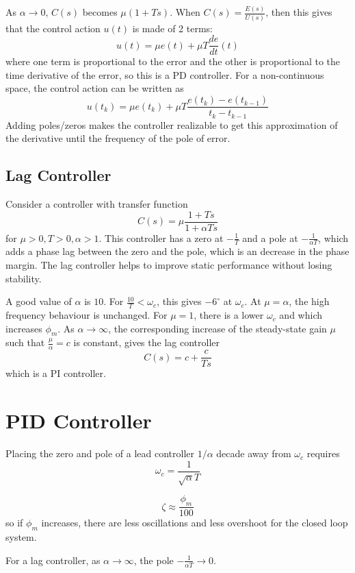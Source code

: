 \documentclass[11pt]{article}
\begin{document}
As \(\alpha \to 0\), \(C(s)\) becomes \(\mu(1 + Ts)\).
When \(C(s) = \frac{E(s)}{U(s)}\), then this gives that the control action \(u(t)\) is made of 2 terms:
$$ u(t) = \mu e(t) + \mu T \frac{de}{dt}(t) $$
where one term is proportional to the error and the other is proportional to the time derivative of the
error, so this is a PD controller.
For a non-continuous space, the control action can be written as
$$ u(t_{k}) = \mu e(t_{k}) + \mu T \frac{e(t_{k}) - e(t_{k-1})}{t_{k} - t_{k-1}} $$
Adding poles/zeros makes the controller realizable to get this approximation of the derivative until
the frequency of the pole of error.
\subsection{Lag Controller}
\label{sec:org50a3161}
Consider a controller with transfer function
$$ C(s) = \mu\frac{1 + Ts}{1 + \alpha Ts} $$
for \(\mu > 0, T > 0, \alpha > 1\).
This controller has a zero at \(-\frac{1}{T}\) and a pole at \(-\frac{1}{\alpha T}\),
which adds a phase lag between the zero and the pole, which is an decrease in the phase margin.
The lag controller helps to improve static performance without losing stability.

A good value of \(\alpha\) is \(10\).
For \(\frac{10}{T} < \omega_{c}\), this gives \(-6^{\circ}\) at \(\omega_{c}\).
At \(\mu = \alpha\), the high frequency behaviour is unchanged.
For \(\mu = 1\), there is a lower \(\omega_{c}\) and which increases \(\phi_{m}\).
As \(\alpha \to \infty\), the corresponding increase of the steady-state gain \(\mu\) such that
\(\frac{\mu}{\alpha} = c\) is constant, gives the lag controller
$$ C(s) = c + \frac{c}{Ts} $$
which is a PI controller.
\section{PID Controller}
\label{sec:org905b6af}
Placing the zero and pole of a lead controller \(1/\alpha\) decade away from \(\omega_{c}\) requires
$$ \omega_{c} = \frac{1}{\sqrt{\alpha} T} $$

$$ \zeta \approx \frac{\phi_{m}}{100} $$
so if \(\phi_{m}\) increases, there are less oscillations and less overshoot for the closed loop system.

For a lag controller, as \(\alpha \to \infty\), the pole \(-\frac{1}{\alpha T} \to 0\).
\end{document}
